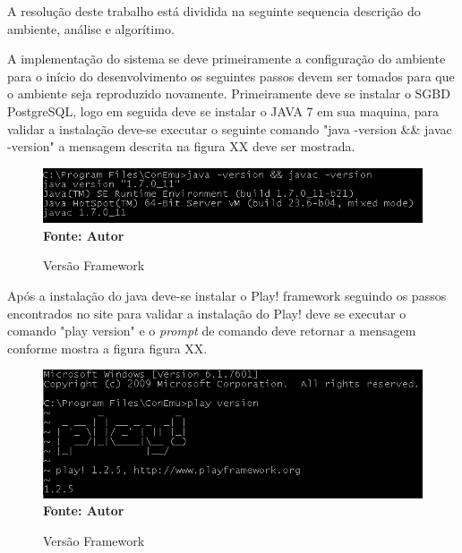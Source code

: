 \documentclass{abntpuc}
\begin{document}
%
%
%
%






A resolução deste trabalho está dividida na seguinte sequencia descrição do ambiente, análise e algorítimo.\par



A implementação do sistema se deve primeiramente a configuração do ambiente para o início do desenvolvimento os seguintes passos devem ser tomados para que o ambiente seja reproduzido novamente. Primeiramente deve se instalar o SGBD PostgreSQL, logo em seguida deve se instalar o JAVA 7 em sua maquina, para validar a instalação deve-se executar o seguinte comando "java -version && javac -version" a mensagem descrita na figura XX deve ser mostrada.

\begin{figure}[!htb]
\caption[Versão Framework]{Versão Framework}
\label{fig:figura2}
\centering
\includegraphics[scale=0.8]{imagens/mensagemJava.png}
\\ \textbf{\footnotesize Fonte: Autor}
\end{figure}


Após a instalação do java deve-se instalar o Play! framework seguindo os passos encontrados no site \cite{play} para validar a instalação do Play! deve se executar o comando "play version" e o \textit{prompt} de comando deve retornar a mensagem conforme mostra a figura figura XX.

\begin{figure}[!htb]
\caption[Versão Framework]{Versão Framework}
\label{fig:figura2}
\centering
\includegraphics[scale=0.8]{imagens/mensagemPlay.png}
\\ \textbf{\footnotesize Fonte: Autor}
\end{figure}
\end{document}

